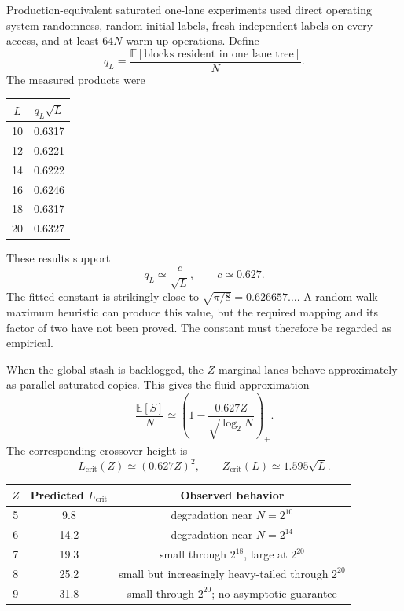\documentclass[11pt]{article}
\newcommand{\E}{\mathbb{E}}
\begin{document}
Production-equivalent saturated one-lane experiments used direct operating
system randomness, random initial labels, fresh independent labels on every
access, and at least $64N$ warm-up operations.  Define
\[
  q_L=\frac{\E[\text{blocks resident in one lane tree}]}{N}.
\]
The measured products were
\begin{center}
\begin{tabular}{c@{\qquad}c}
\toprule
$L$ & $q_L\sqrt L$ \\
\midrule
10 & 0.6317 \\
12 & 0.6221 \\
14 & 0.6222 \\
16 & 0.6246 \\
18 & 0.6317 \\
20 & 0.6327 \\
\bottomrule
\end{tabular}
\end{center}
These results support
\begin{equation}
\label{eq:fitted-q}
  q_L\simeq\frac{c}{\sqrt L},\qquad c\simeq0.627.
\end{equation}
The fitted constant is strikingly close to
$\sqrt{\pi/8}=0.626657\ldots$.  A random-walk maximum heuristic can produce
this value, but the required mapping and its factor of two have not been
proved.  The constant must therefore be regarded as empirical.

When the global stash is backlogged, the $Z$ marginal lanes behave
approximately as parallel saturated copies.  This gives the fluid
approximation
\begin{equation}
\label{eq:stash-law}
  \boxed{
  \frac{\E[S]}{N}
  \simeq
  \left(1-\frac{0.627Z}{\sqrt{\log_2N}}\right)_+.}
\end{equation}
The corresponding crossover height is
\begin{equation}
\label{eq:crossover}
  L_{\mathrm{crit}}(Z)\simeq(0.627Z)^2,
  \qquad
  Z_{\mathrm{crit}}(L)\simeq1.595\sqrt L.
\end{equation}

\begin{center}
\begin{tabular}{ccc}
\toprule
$Z$ & Predicted $L_{\mathrm{crit}}$ & Observed behavior \\
\midrule
5 & 9.8  & degradation near $N=2^{10}$ \\
6 & 14.2 & degradation near $N=2^{14}$ \\
7 & 19.3 & small through $2^{18}$, large at $2^{20}$ \\
8 & 25.2 & small but increasingly heavy-tailed through $2^{20}$ \\
9 & 31.8 & small through $2^{20}$; no asymptotic guarantee \\
\bottomrule
\end{tabular}
\end{center}
\end{document}
